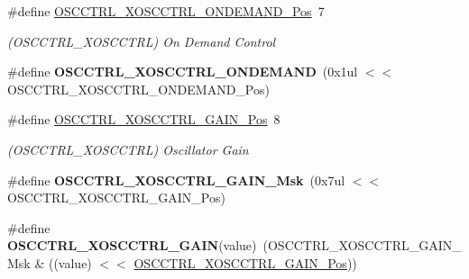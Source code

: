 \begin{DoxyCompactItemize}
\item 
\hypertarget{group___s_a_m_l21___o_s_c_c_t_r_l_ga3d087d7558147bb7da1da3c88ea2103c}{}\#define \hyperlink{group___s_a_m_l21___o_s_c_c_t_r_l_ga3d087d7558147bb7da1da3c88ea2103c}{O\+S\+C\+C\+T\+R\+L\+\_\+\+X\+O\+S\+C\+C\+T\+R\+L\+\_\+\+O\+N\+D\+E\+M\+A\+N\+D\+\_\+\+Pos}~7\label{group___s_a_m_l21___o_s_c_c_t_r_l_ga3d087d7558147bb7da1da3c88ea2103c}

\begin{DoxyCompactList}\small\item\em (O\+S\+C\+C\+T\+R\+L\+\_\+\+X\+O\+S\+C\+C\+T\+R\+L) On Demand Control \end{DoxyCompactList}\item 
\hypertarget{group___s_a_m_l21___o_s_c_c_t_r_l_ga31e1ba87d205ae993049c92b756e8e9c}{}\#define {\bfseries O\+S\+C\+C\+T\+R\+L\+\_\+\+X\+O\+S\+C\+C\+T\+R\+L\+\_\+\+O\+N\+D\+E\+M\+A\+N\+D}~(0x1ul $<$$<$ O\+S\+C\+C\+T\+R\+L\+\_\+\+X\+O\+S\+C\+C\+T\+R\+L\+\_\+\+O\+N\+D\+E\+M\+A\+N\+D\+\_\+\+Pos)\label{group___s_a_m_l21___o_s_c_c_t_r_l_ga31e1ba87d205ae993049c92b756e8e9c}

\item 
\hypertarget{group___s_a_m_l21___o_s_c_c_t_r_l_gaa28ce6ad8c4bb8d26c03a3c59b6d8595}{}\#define \hyperlink{group___s_a_m_l21___o_s_c_c_t_r_l_gaa28ce6ad8c4bb8d26c03a3c59b6d8595}{O\+S\+C\+C\+T\+R\+L\+\_\+\+X\+O\+S\+C\+C\+T\+R\+L\+\_\+\+G\+A\+I\+N\+\_\+\+Pos}~8\label{group___s_a_m_l21___o_s_c_c_t_r_l_gaa28ce6ad8c4bb8d26c03a3c59b6d8595}

\begin{DoxyCompactList}\small\item\em (O\+S\+C\+C\+T\+R\+L\+\_\+\+X\+O\+S\+C\+C\+T\+R\+L) Oscillator Gain \end{DoxyCompactList}\item 
\hypertarget{group___s_a_m_l21___o_s_c_c_t_r_l_ga085ba1b687f6746d211fe73b441a1d51}{}\#define {\bfseries O\+S\+C\+C\+T\+R\+L\+\_\+\+X\+O\+S\+C\+C\+T\+R\+L\+\_\+\+G\+A\+I\+N\+\_\+\+Msk}~(0x7ul $<$$<$ O\+S\+C\+C\+T\+R\+L\+\_\+\+X\+O\+S\+C\+C\+T\+R\+L\+\_\+\+G\+A\+I\+N\+\_\+\+Pos)\label{group___s_a_m_l21___o_s_c_c_t_r_l_ga085ba1b687f6746d211fe73b441a1d51}

\item 
\hypertarget{group___s_a_m_l21___o_s_c_c_t_r_l_ga7c0583b63d17abbeb9be8aecda8fa268}{}\#define {\bfseries O\+S\+C\+C\+T\+R\+L\+\_\+\+X\+O\+S\+C\+C\+T\+R\+L\+\_\+\+G\+A\+I\+N}(value)~(O\+S\+C\+C\+T\+R\+L\+\_\+\+X\+O\+S\+C\+C\+T\+R\+L\+\_\+\+G\+A\+I\+N\+\_\+\+Msk \& ((value) $<$$<$ \hyperlink{group___s_a_m_l21___o_s_c_c_t_r_l_gaa28ce6ad8c4bb8d26c03a3c59b6d8595}{O\+S\+C\+C\+T\+R\+L\+\_\+\+X\+O\+S\+C\+C\+T\+R\+L\+\_\+\+G\+A\+I\+N\+\_\+\+Pos}))\label{group___s_a_m_l21___o_s_c_c_t_r_l_ga7c0583b63d17abbeb9be8aecda8fa268}


\end{DoxyCompactItemize}
